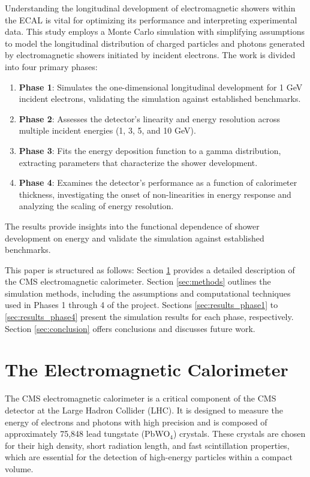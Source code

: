 \documentclass[twocolumn]{aastex631}
\begin{document}
Understanding the longitudinal development of electromagnetic showers within the ECAL is vital for optimizing its performance and interpreting experimental data. This study employs a Monte Carlo simulation with simplifying assumptions to model the longitudinal distribution of charged particles and photons generated by electromagnetic showers initiated by incident electrons. The work is divided into four primary phases:

\begin{enumerate}
    \item \textbf{Phase 1}: Simulates the one-dimensional longitudinal development for 1 GeV incident electrons, validating the simulation against established benchmarks.
    \item \textbf{Phase 2}: Assesses the detector's linearity and energy resolution across multiple incident energies (1, 3, 5, and 10 GeV).
    \item \textbf{Phase 3}: Fits the energy deposition function to a gamma distribution, extracting parameters that characterize the shower development.
    \item \textbf{Phase 4}: Examines the detector's performance as a function of calorimeter thickness, investigating the onset of non-linearities in energy response and analyzing the scaling of energy resolution.
\end{enumerate}

The results provide insights into the functional dependence of shower development on energy and validate the simulation against established benchmarks.

This paper is structured as follows: Section \ref{sec:ecal} provides a detailed description of the CMS electromagnetic calorimeter. Section \ref{sec:methods} outlines the simulation methods, including the assumptions and computational techniques used in Phases 1 through 4 of the project. Sections \ref{sec:results_phase1} to \ref{sec:results_phase4} present the simulation results for each phase, respectively. Section \ref{sec:conclusion} offers conclusions and discusses future work.

\section{The Electromagnetic Calorimeter}\label{sec:ecal}

The CMS electromagnetic calorimeter is a critical component of the CMS detector at the Large Hadron Collider (LHC). It is designed to measure the energy of electrons and photons with high precision and is composed of approximately 75,848 lead tungstate (PbWO\(_4\)) crystals. These crystals are chosen for their high density, short radiation length, and fast scintillation properties, which are essential for the detection of high-energy particles within a compact volume.
\end{document}
